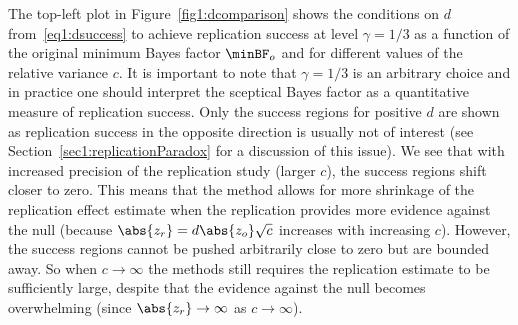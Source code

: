 The top-left plot in Figure~\ref{fig1:dcomparison} shows the conditions on $d$
from~\eqref{eq1:dsuccess} to achieve replication success at level $\gamma = 1/3$
as a function of the original minimum Bayes factor $\minBF_{o}$ and for
different values of the relative variance $c$. It is important to note that
$\gamma = 1/3$ is an arbitrary choice and in practice one should interpret the
sceptical Bayes factor as a quantitative measure of replication success. Only
the success regions for positive $d$ are shown as replication success in the
opposite direction is usually not of interest (see
Section~\ref{sec1:replicationParadox} for a discussion of this issue). We see
that with increased precision of the replication study (larger $c$), the success
regions shift closer to zero. This means that the method allows for more
shrinkage of the replication effect estimate when the replication provides more
evidence against the null (because $\abs{z_{r}} = d \abs{z_{o}} \sqrt{c}$
increases with increasing $c$). However, the success regions cannot be pushed
arbitrarily close to zero but are bounded away. So when $c \to \infty$ the
methods still requires the replication estimate to be sufficiently large,
despite that the evidence against the null becomes overwhelming (since
$\abs{z_{r}} \to \infty$ as $c \to \infty$).

